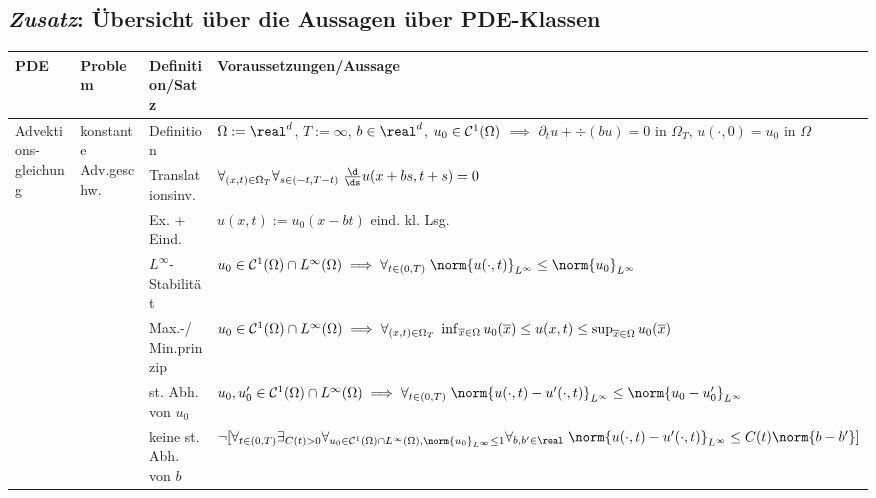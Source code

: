 \begin{landscape}
    \subsection{%
        \emph{Zusatz}: Übersicht über die Aussagen über PDE-Klassen%
    }

    \footnotesize

    \begin{tabular}{p{20mm}p{20mm}p{30mm}p{169mm}}
        \toprule

        \textbf{PDE}&
        \textbf{Problem}&
        \textbf{Definition/Satz}&
        \textbf{Voraussetzungen/Aussage}\\

        \midrule

        \multirow{9}{20mm}{Advektions-gleichung}&
        \multirow{7}{20mm}{konstante Adv.geschw.}&
        Definition&
        $\Omega := \real^d$, $T := \infty$, $b \in \real^d$, $u_0 \in \mathcal{C}^1(\Omega)$
        $\implies$
        $\partial_t u + \div(bu) = 0$ in $\Omega_T$, $u(\cdot, 0) = u_0$ in $\Omega$\\

        &&Translationsinv.&
        $\forall_{(x, t) \in \Omega_T} \forall_{s \in (-t, T-t)}\;
        \frac{\d}{\ds} u(x + bs, t + s) = 0$\\

        &&Ex. + Eind.&
        $u(x, t) := u_0(x - bt)$ eind. kl. Lsg.\\

        &&$L^\infty$-Stabilität&
        $u_0 \in \C^1(\Omega) \cap L^\infty(\Omega) \implies
        \forall_{t \in (0, T)}\; \norm{u(\cdot, t)}_{L^\infty} \le \norm{u_0}_{L^\infty}$\\

        &&Max.-/Min.prinzip&
        $u_0 \in \mathcal{C}^1(\Omega) \cap L^\infty(\Omega) \implies
        \forall_{(x, t) \in \Omega_T}\;
        \inf_{\overline{x} \in \Omega} u_0(\overline{x}) \le u(x, t) \le
        \sup_{\overline{x} \in \Omega} u_0(\overline{x})$\\

        &&st. Abh. von $u_0$&
        $u_0, u_0' \in \C^1(\Omega) \cap L^\infty(\Omega) \implies
        \forall_{t \in (0, T)}\;
        \norm{u(\cdot, t) - u'(\cdot, t)}_{L^\infty} \le \norm{u_0 - u_0'}_{L^\infty}$\\

        &&keine st. Abh. von $b$&
        $\lnot[\forall_{t \in (0, T)} \exists_{C(t) > 0}
        \forall_{u_0 \in \C^1(\Omega) \cap L^\infty(\Omega), \norm{u_0}_{L^\infty} \le 1}
        \forall_{b, b' \in \real}\;
        \norm{u(\cdot, t) - u'(\cdot, t)}_{L^\infty} \le C(t) \norm{b - b'}]$\\


\end{tabular}
\end{landscape}
